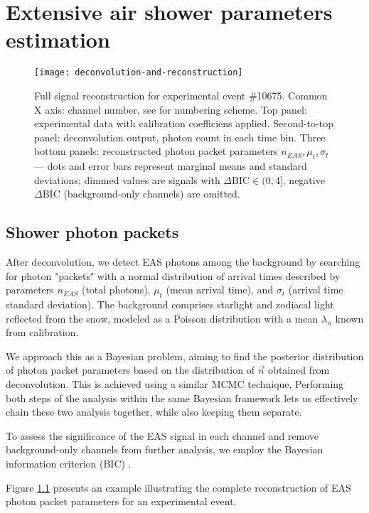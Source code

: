 \chapter{Extensive air shower parameters estimation}

\begin{figure}
	\label{pic:deconvolution-and-reconstruction}
	\centering
	\texttt{[image: deconvolution-and-reconstruction]}
	\caption{Full signal reconstruction for experimental event \#10675. Common X axis: channel number, see \cite{SphereCalibration2016} for numbering scheme. Top panel: experimental data with calibration coefficiens applied. Second-to-top panel: deconvolution output, photon count in each time bin. Three bottom panels: reconstructed photon packet parameters $n_{EAS}, \mu_t, \sigma_t$ --- dots and error bars represent marginal means and standard deviations; dimmed values are signals with $\Delta \mathrm{BIC} \in (0, 4]$, negative $\Delta \mathrm{BIC}$ (background-only channels) are omitted.}
\end{figure}

\section{Shower photon packets}
\label{sec:signal-reconstruction}

After deconvolution, we detect EAS photons among the background by searching for photon "packets" with a normal distribution of arrival times described by parameters $n_{EAS}$ (total photons), $\mu_t$ (mean arrival time), and $\sigma_t$ (arrival time standard deviation). The background comprises starlight and zodiacal light reflected from the snow, modeled as a Poisson distribution with a mean $\lambda_{n}$ known from calibration.

We approach this as a Bayesian problem, aiming to find the posterior distribution of photon packet parameters based on the distribution of $\vec{n}$ obtained from deconvolution. This is achieved using a similar MCMC technique. Performing both steps of the analysis within the same Bayesian framework lets us effectively chain these two analysis together, while also keeping them separate.

To assess the significance of the EAS signal in each channel and remove background-only channels from further analysis, we employ the Bayesian information criterion (BIC) \cite{Schwarz1978}.



Figure \ref{pic:deconvolution-and-reconstruction} presents an example illustrating the complete reconstruction of EAS photon packet parameters for an experimental event.

